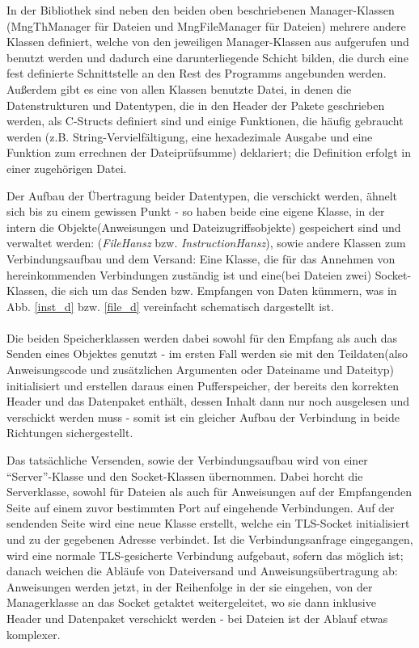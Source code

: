 In der Bibliothek sind neben den beiden oben beschriebenen Manager-Klassen (MngThManager für Dateien und MngFileManager für Dateien) mehrere andere Klassen definiert, welche von den jeweiligen Manager-Klassen aus aufgerufen und benutzt werden und dadurch eine darunterliegende Schicht bilden, die durch eine fest definierte Schnittstelle an den Rest des Programms angebunden werden.
Außerdem gibt es eine von allen Klassen benutzte Datei, in denen die Datenstrukturen und Datentypen, die in den Header der Pakete geschrieben werden, als C-Structs definiert sind und einige Funktionen, die häufig gebraucht werden (z.B. String-Vervielfältigung, eine hexadezimale Ausgabe und eine Funktion zum errechnen der Dateiprüfsumme) deklariert; die Definition erfolgt in einer zugehörigen Datei.\par
Der Aufbau der Übertragung beider Datentypen, die verschickt werden, ähnelt sich bis zu einem gewissen Punkt - so haben beide eine eigene Klasse, in der intern die Objekte(Anweisungen und Dateizugriffsobjekte) gespeichert sind und verwaltet werden: (\textit{FileHansz} bzw. \textit{InstructionHansz}), sowie andere Klassen zum Verbindungsaufbau und dem Versand: Eine Klasse, die für das Annehmen von hereinkommenden Verbindungen zuständig ist und eine(bei Dateien zwei) Socket-Klassen, die sich um das Senden bzw. Empfangen von Daten kümmern, was in Abb. \ref{inst_d} bzw. \ref{file_d} vereinfacht schematisch dargestellt ist.\\\\
Die beiden Speicherklassen werden dabei sowohl für den Empfang als auch das Senden eines Objektes genutzt - im ersten Fall werden sie mit den Teildaten(also Anweisungscode und zusätzlichen Argumenten oder Dateiname und Dateityp)
 initialisiert und erstellen daraus einen Pufferspeicher, der bereits den korrekten Header und das Datenpaket enthält, dessen Inhalt dann nur noch ausgelesen und verschickt werden muss - somit ist ein gleicher Aufbau der Verbindung in beide Richtungen sichergestellt.\par
Das tatsächliche Versenden, sowie der Verbindungsaufbau wird von einer "`Server"'-Klasse und den Socket-Klassen übernommen.
Dabei horcht die Serverklasse, sowohl für Dateien als auch für Anweisungen auf der Empfangenden Seite auf einem zuvor bestimmten Port auf eingehende Verbindungen.
Auf der sendenden Seite wird eine neue Klasse erstellt, welche ein TLS-Socket initialisiert und zu der gegebenen Adresse verbindet.
Ist die Verbindungsanfrage eingegangen, wird eine normale TLS-gesicherte Verbindung aufgebaut, sofern das möglich ist; danach weichen die Abläufe von Dateiversand und Anweisungsübertragung ab: Anweisungen werden jetzt, in der Reihenfolge in der sie eingehen, von der Managerklasse an das Socket getaktet weitergeleitet, wo sie dann inklusive Header und Datenpaket verschickt werden - bei Dateien ist der Ablauf etwas komplexer.\par


